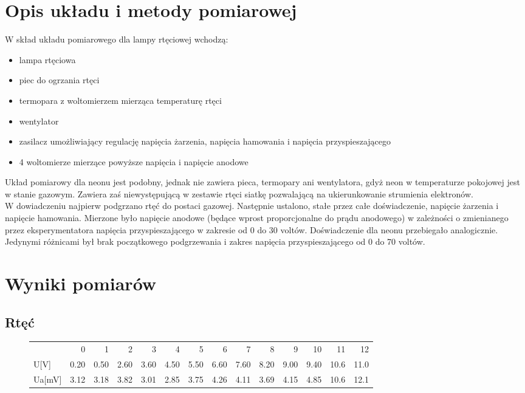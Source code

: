 \documentclass[a4paper,10pt]{article}
\begin{document}
\section{Opis układu i metody pomiarowej}
W skład układu pomiarowego dla lampy rtęciowej wchodzą:
\begin{itemize}
  \item lampa rtęciowa
  \item piec do ogrzania rtęci
  \item termopara z woltomierzem mierząca temperaturę rtęci
  \item wentylator
  \item zasilacz umożliwiający regulację napięcia żarzenia, napięcia hamowania i napięcia przyspieszającego
  \item 4 woltomierze mierzące powyższe napięcia i napięcie anodowe
\end{itemize}
Układ pomiarowy dla neonu jest podobny, jednak nie zawiera pieca, termopary ani wentylatora, gdyż neon w temperaturze pokojowej jest w stanie gazowym. Zawiera zaś niewystępującą w
zestawie rtęci siatkę pozwalającą na ukierunkowanie strumienia elektronów.\\
W dowiadczeniu najpierw podgrzano rtęć do postaci gazowej. Następnie ustalono, stałe przez całe doświadczenie, napięcie żarzenia i napięcie hamowania. Mierzone było napięcie
anodowe (będące wprost proporcjonalne do prądu anodowego) w zależności o zmienianego przez eksperymentatora napięcia przyspieszającego w zakresie od 0 do 30 voltów. Doświadczenie
dla neonu przebiegało analogicznie. Jedynymi różnicami był brak początkowego podgrzewania i zakres napięcia przyspieszającego od 0 do 70 voltów.

\section{Wyniki pomiarów}
\subsection{Rtęć}
\begin{figure}[H]
\begin{tabular}{lrrrrrrrrrrrrr}
{} &    0  &    1  &    2  &    3  &    4  &    5  &    6  &    7  &    8  &    9  &    10 &    11 &    12 \\
U[V]  &  0.20 &  0.50 &  2.60 &  3.60 &  4.50 &  5.50 &  6.60 &  7.60 &  8.20 &  9.00 &  9.40 &  10.6 &  11.0 \\
Ua[mV] &  3.12 &  3.18 &  3.82 &  3.01 &  2.85 &  3.75 &  4.26 &  4.11 &  3.69 &  4.15 &  4.85 &  10.6 &  12.1 \\
\end{tabular}
\end{figure}
\end{document}
